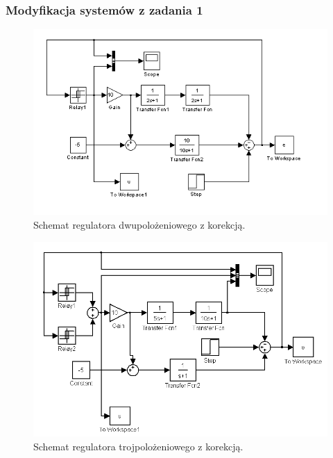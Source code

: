 \documentclass[a4paper,10pt]{article}
\begin{document}
\subsubsection{Modyfikacja systemów z zadania 1}\label{sec:zad2_1}
\begin{figure}[!h]
    \centering
	\includegraphics[width=120mm]{CW3-schemat-2k.png}
	\caption{Schemat regulatora dwupolożeniowego z korekcją.}
    \label{fig:Rysunek}
\end{figure}

\begin{figure}[!h]
    \centering
	\includegraphics[width=120mm]{CW3-schemat-3k.png}
	\caption{Schemat regulatora trojpolożeniowego z korekcją.}
    \label{fig:Rysunek}
\end{figure}
\newpage
\end{document}

